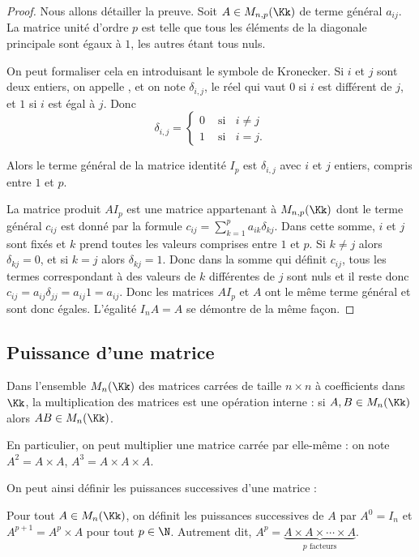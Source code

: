 \documentclass[class=report,crop=false]{standalone}
\begin{document}
\begin{proof}
Nous allons détailler la preuve.
Soit  $A \in M_{n,p}(\Kk)$ de terme général $a_{ij}$.
La matrice unité d'ordre $p$ est telle que tous les éléments de la
diagonale principale sont égaux à $1$, les autres étant tous nuls.

On peut formaliser cela en introduisant le symbole de Kronecker.
Si $i$ et $j$ sont deux entiers, on appelle , et on
note $\delta_{i,j}$, le réel qui vaut $0$ si $i$ est différent de $j$,
et $1$ si $i$ est
égal à $j$. Donc
$$\delta_{i,j}=\begin{cases}
0 & \text{ si } \;\; i\neq j \\
1 & \text{ si } \;\; i=j.
\end{cases}$$

Alors le terme général de la matrice identité $I_{p}$ est $\delta_{i,j}$
avec $i$ et $j$ entiers, compris entre $1$ et $p$.

La matrice produit $AI_{p}$
est une matrice appartenant à $M_{n,p}(\Kk)$
dont le terme général $c_{ij}$ est donné par la formule
$c_{ij}={\displaystyle \sum_{k=1}^{p}a_{ik}\delta_{kj}}$.
Dans cette somme, $i$ et $j$ sont fixés et $k$ prend toutes les valeurs
comprises entre $1$ et $p$. Si $k\neq j$ alors $\delta_{kj}=0$,
et si $k=j$ alors $\delta_{kj}=1$.
Donc dans la somme qui définit $c_{ij}$,
tous les termes correspondant à des valeurs de $k$ différentes de $j$
sont nuls et il reste donc
$c_{ij}=a_{ij}\delta_{jj}=a_{ij}1=a_{ij}$.
Donc les matrices $AI_{p}$ et $A$ ont le même terme général et
sont donc égales.
L'égalité $I_{n}A=A$ se démontre de la même façon.
\end{proof}

\subsection{Puissance d'une matrice}

Dans l'ensemble $M_{n}(\Kk)$ des matrices carrées de taille $n \times n$ à
coefficients dans $\Kk$,
la multiplication des matrices est une
opération interne : si $A,B \in M_n(\Kk)$ alors $AB \in M_n(\Kk)$.

En particulier, on peut multiplier une matrice carrée par elle-même :
on note $A^2 = A \times A$, $A^3 = A \times A \times A$.


On peut ainsi définir les puissances successives d'une matrice :
\begin{definition}
Pour tout $A\in M_n(\Kk)$,
on définit les puissances successives de $A$ par $A^0=I_n$ et
$A^{p+1}=A^p \times A$ pour tout $p\in\N$.
Autrement dit, $A^p = \underbrace{A \times A \times \cdots \times A}_{p \text{ facteurs}}$.
\end{definition}
\end{document}
